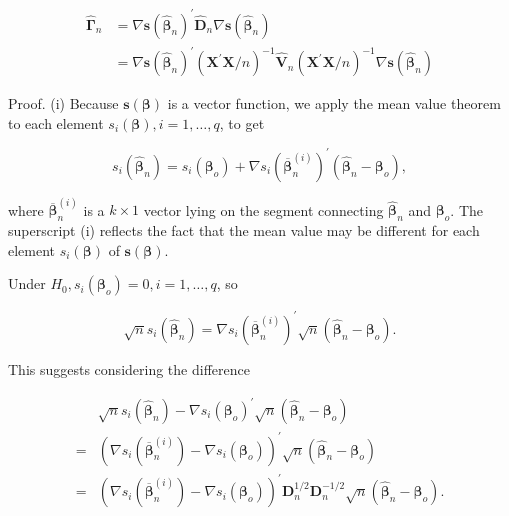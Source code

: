 \documentclass[10pt]{article}
\begin{document}
$$
\begin{aligned}
\hat{\boldsymbol{\Gamma}}_{n} & =\nabla \mathbf{s}\left(\hat{\boldsymbol{\beta}}_{n}\right)^{\prime} \hat{\mathbf{D}}_{n} \nabla \mathbf{s}\left(\hat{\boldsymbol{\beta}}_{n}\right) \\
& =\nabla \mathbf{s}\left(\hat{\boldsymbol{\beta}}_{n}\right)^{\prime}\left(\mathbf{X}^{\prime} \mathbf{X} / n\right)^{-1} \hat{\mathbf{V}}_{n}\left(\mathbf{X}^{\prime} \mathbf{X} / n\right)^{-1} \nabla \mathbf{s}\left(\hat{\boldsymbol{\beta}}_{n}\right)
\end{aligned}
$$

Proof. (i) Because $\mathbf{s}(\boldsymbol{\beta})$ is a vector function, we apply the mean value theorem to each element $s_{i}(\boldsymbol{\beta}), i=1, \ldots, q$, to get

$$
s_{i}\left(\hat{\boldsymbol{\beta}}_{n}\right)=s_{i}\left(\boldsymbol{\beta}_{o}\right)+\nabla s_{i}\left(\overline{\boldsymbol{\beta}}_{n}^{(i)}\right)^{\prime}\left(\hat{\boldsymbol{\beta}}_{n}-\boldsymbol{\beta}_{o}\right),
$$

where $\overline{\boldsymbol{\beta}}_{n}^{(i)}$ is a $k \times 1$ vector lying on the segment connecting $\hat{\boldsymbol{\beta}}_{n}$ and $\boldsymbol{\beta}_{o}$. The superscript (i) reflects the fact that the mean value may be different for each element $s_{i}(\boldsymbol{\beta})$ of $\mathbf{s}(\boldsymbol{\beta})$.

Under $H_{0}, s_{i}\left(\boldsymbol{\beta}_{o}\right)=0, i=1, \ldots, q$, so

$$
\sqrt{n} s_{i}\left(\hat{\boldsymbol{\beta}}_{n}\right)=\nabla s_{i}\left(\overline{\boldsymbol{\beta}}_{n}^{(i)}\right)^{\prime} \sqrt{n}\left(\hat{\boldsymbol{\beta}}_{n}-\boldsymbol{\beta}_{o}\right) .
$$

This suggests considering the difference

$$
\begin{aligned}
& \sqrt{n} s_{i}\left(\hat{\boldsymbol{\beta}}_{n}\right)-\nabla s_{i}\left(\boldsymbol{\beta}_{o}\right)^{\prime} \sqrt{n}\left(\hat{\boldsymbol{\beta}}_{n}-\boldsymbol{\beta}_{o}\right) \\
= & \left(\nabla s_{i}\left(\overline{\boldsymbol{\beta}}_{n}^{(i)}\right)-\nabla s_{i}\left(\boldsymbol{\beta}_{o}\right)\right)^{\prime} \sqrt{n}\left(\hat{\boldsymbol{\beta}}_{n}-\boldsymbol{\beta}_{o}\right) \\
= & \left(\nabla s_{i}\left(\overline{\boldsymbol{\beta}}_{n}^{(i)}\right)-\nabla s_{i}\left(\boldsymbol{\beta}_{o}\right)\right)^{\prime} \mathbf{D}_{n}^{1 / 2} \mathbf{D}_{n}^{-1 / 2} \sqrt{n}\left(\hat{\boldsymbol{\beta}}_{n}-\boldsymbol{\beta}_{o}\right) .
\end{aligned}
$$
\end{document}
